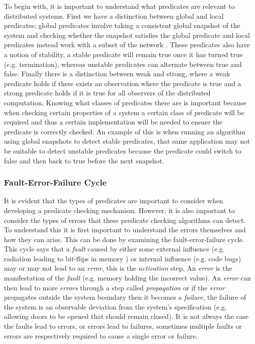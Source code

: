 To begin with, it is important to understand what predicates are relevant to distributed systems. First we have a distinction between global and local predicates; global predicates involve taking a consistent global snapshot of the system and checking whether the snapshot satisfies the global predicate \cite{277788} and local predicates instead work with a subset of the network \cite{553309}. These predicates also have a notion of stability, a stable predicate will remain true once it has turned true (e.g. termination), whereas unstable predicates can alternate between true and false. Finally there is a distinction between weak and strong, where a weak predicate holds if there exists an observation where the predicate is true and a strong predicate holds if it is true for all observers of the distributed computation\cite{553309,Cooper:1991:CDG:127695.122774}. Knowing what classes of predicates there are is important because when checking certain properties of a system a certain class of predicate will be required and thus a certain implementation will be needed to ensure the predicate is correctly checked. An example of this is when running an algorithm using global snapshots to detect stable predicates, that same application may not be suitable to detect unstable predicates because the predicate could switch to false and then back to true before the next snapshot.

\subsubsection{Fault-Error-Failure Cycle}

It is evident that the types of predicates are important to consider when developing a predicate checking mechanism. However, it is also important to consider the types of errors that these predicate checking algorithms can detect. To understand this it is first important to understand the errors themselves and how they can arise. This can be done by examining the fault-error-failure cycle. This cycle says that a \emph{fault} caused by either some external influence (e.g. radiation leading to bit-flips in memory \cite{1017791}) or internal influence (e.g. code bugs) may or may not lead to an \emph{error}, this is the \emph{activation} step. An \emph{error} is the manifestation of the \emph{fault} (e.g. memory holding the incorrect value). An \emph{error} can then lead to more \emph{errors} through a step called \emph{propagation} or if the \emph{error} propagates outside the system boundary then it becomes a \emph{failure}, the failure of the system is an observable deviation from the system's specification (e.g. allowing doors to be opened that should remain closed). It is not always the case the faults lead to errors, or errors lead to failures, sometimes multiple faults or errors are respectively required to cause a single error or failure. \cite{1335465}

